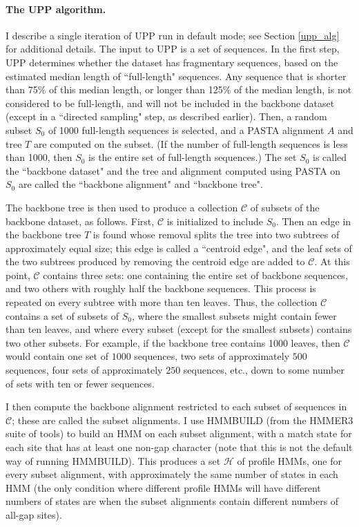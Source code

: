 \paragraph{The UPP algorithm.}
I describe a single iteration of UPP run
in default mode;
see Section \ref{upp_alg} for additional details.
The input to UPP is a set of sequences.
In the first step, UPP determines whether the
dataset has fragmentary sequences, based
on the estimated median length 
of ``full-length" sequences.
Any sequence that is shorter than 75\% of this
median length,  or longer 
than 125\% of the median length, is
not considered to be full-length, and will not be 
included in the backbone dataset (except
in a ``directed sampling" step, as described
earlier).
Then, a random subset $S_0$ of 1000 full-length  sequences
is selected,
 and a PASTA alignment $A$ and tree $T$ are
computed on the subset.
(If the number of full-length sequences is less than 1000,
then $S_0$ is the entire set of full-length sequences.)
The set $S_0$ is called the ``backbone dataset" and
the tree and alignment computed using PASTA on 
$S_0$ are called the ``backbone alignment" and
``backbone tree".

The backbone tree is then used to produce a
collection $\mathcal C$ of subsets of the backbone
dataset, as follows.
First, $\mathcal C$ is initialized
to include $S_0$.
Then an edge in the backbone tree $T$ is found
whose removal splits the tree into two 
subtrees of approximately equal size;
this edge is called a ``centroid edge",
and the leaf sets of the two subtrees produced by removing
the centroid edge  are added to $\mathcal C$. 
At this point, $\mathcal C$ contains three sets: one
containing the entire set of backbone sequences, and two others
with roughly half the backbone sequences.
This  process is repeated on every subtree with more
than ten leaves.
Thus, the collection $\mathcal C$ contains a set of
subsets of $S_0$, where the smallest subsets might
contain fewer than ten leaves, and where every subset
(except for  the
smallest subsets) contains two other subsets.
For example, if the backbone tree contains 1000 leaves, then
$\mathcal C$ would contain one set of
$1000$ sequences, two sets of approximately $500$ sequences, four sets of
approximately $250$ sequences, etc., 
down to some number of sets
with ten or fewer sequences.

I then compute the backbone
alignment restricted to each subset of sequences in $\mathcal C$;
these are called the subset alignments.
I use HMMBUILD (from the HMMER3 suite of tools)
to build an HMM on each subset alignment,
with a match state for each site that has at least one
non-gap character (note that this is not the default
way of running HMMBUILD). 
This produces a set $\mathcal{H}$ of profile HMMs,
one for every subset alignment, with approximately the
same number of states in each HMM (the only
condition where different profile HMMs will have 
different numbers of states are when the subset alignments
contain different numbers of all-gap sites).

